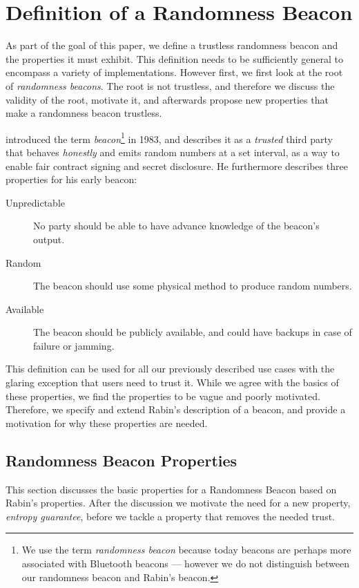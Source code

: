 \section{Definition of a Randomness Beacon}\label{sec:beacons}

As part of the goal of this paper, we define a trustless randomness beacon and the properties it must exhibit.
This definition needs to be sufficiently general to encompass a variety of implementations.
However first, we first look at the root of \emph{randomness beacons}.
The root is not trustless, and therefore we discuss the validity of the root, motivate it, and afterwards propose new properties that make a randomness beacon trustless.

\citet{rabin1983transaction} introduced the term \emph{beacon}\footnote{We use the term \emph{randomness beacon} because today beacons are perhaps more associated with Bluetooth beacons --- however we do not distinguish between our randomness beacon and Rabin's beacon.} in 1983, and describes it as a \emph{trusted} third party that behaves \emph{honestly} and emits random numbers at a set interval, as a way to enable fair contract signing and secret disclosure.
He furthermore describes three properties for his early beacon:

\begin{description}
    \item[Unpredictable] No party should be able to have advance knowledge of the beacon's output.
    \item[Random] The beacon should use some physical method to produce random numbers.
    \item[Available] The beacon should be publicly available, and could have backups in case of failure or jamming.
\end{description}

This definition can be used for all our previously described use cases with the glaring exception that users need to trust it.
While we agree with the basics of these properties, we find the properties to be vague and poorly motivated.
Therefore, we specify and extend Rabin's description of a beacon, and provide a motivation for why these properties are needed.

\subsection{Randomness Beacon Properties}
This section discusses the basic properties for a Randomness Beacon based on Rabin's properties. After the discussion we motivate the need for a new property, \emph{entropy guarantee}, before we tackle a property that removes the needed trust.

